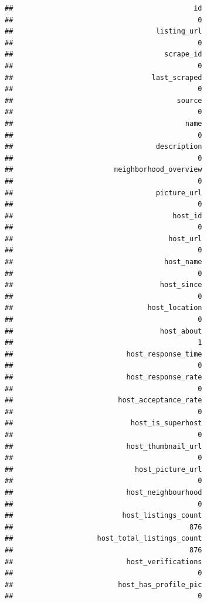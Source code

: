 \documentclass[
]{article}
\begin{document}
\begin{verbatim}
##                                           id 
##                                            0 
##                                  listing_url 
##                                            0 
##                                    scrape_id 
##                                            0 
##                                 last_scraped 
##                                            0 
##                                       source 
##                                            0 
##                                         name 
##                                            0 
##                                  description 
##                                            0 
##                        neighborhood_overview 
##                                            0 
##                                  picture_url 
##                                            0 
##                                      host_id 
##                                            0 
##                                     host_url 
##                                            0 
##                                    host_name 
##                                            0 
##                                   host_since 
##                                            0 
##                                host_location 
##                                            0 
##                                   host_about 
##                                            1 
##                           host_response_time 
##                                            0 
##                           host_response_rate 
##                                            0 
##                         host_acceptance_rate 
##                                            0 
##                            host_is_superhost 
##                                            0 
##                           host_thumbnail_url 
##                                            0 
##                             host_picture_url 
##                                            0 
##                           host_neighbourhood 
##                                            0 
##                          host_listings_count 
##                                          876 
##                    host_total_listings_count 
##                                          876 
##                           host_verifications 
##                                            0 
##                         host_has_profile_pic 
##                                            0 

\end{verbatim}
\end{document}
